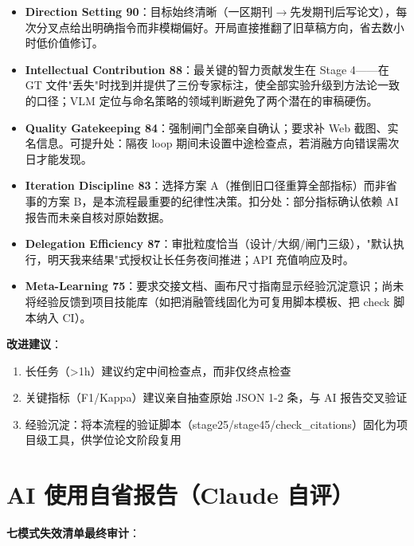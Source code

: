 \documentclass[11pt]{article}
\begin{document}
\begin{itemize}
\item \textbf{Direction Setting 90}{\cjkfont ：目标始终清晰（一区期刊}$\rightarrow${\cjkfont 先发期刊后写论文），每次分叉点给出明确指令而非模糊偏好。开局直接推翻了旧草稿方向，省去数小时低价值修订。}
\item \textbf{Intellectual Contribution 88}{\cjkfont ：最关键的智力贡献发生在} Stage 4------{\cjkfont 在} GT {\cjkfont 文件}"{\cjkfont 丢失}"{\cjkfont 时找到并提供了三份专家标注，使全部实验升级到方法论一致的口径；}VLM {\cjkfont 定位与命名策略的领域判断避免了两个潜在的审稿硬伤。}
\item \textbf{Quality Gatekeeping 84}{\cjkfont ：强制闸门全部亲自确认；要求补} Web {\cjkfont 截图、实名信息。可提升处：隔夜} loop {\cjkfont 期间未设置中途检查点，若消融方向错误需次日才能发现。}
\item \textbf{Iteration Discipline 83}{\cjkfont ：选择方案} A{\cjkfont （推倒旧口径重算全部指标）而非省事的方案} B{\cjkfont ，是本流程最重要的纪律性决策。扣分处：部分指标确认依赖} AI {\cjkfont 报告而未亲自核对原始数据。}
\item \textbf{Delegation Efficiency 87}{\cjkfont ：审批粒度恰当（设计}/{\cjkfont 大纲}/{\cjkfont 闸门三级），}"{\cjkfont 默认执行，明天我来结果}"{\cjkfont 式授权让长任务夜间推进；}API {\cjkfont 充值响应及时。}
\item \textbf{Meta-Learning 75}{\cjkfont ：要求交接文档、画布尺寸指南显示经验沉淀意识；尚未将经验反馈到项目技能库（如把消融管线固化为可复用脚本模板、把} check {\cjkfont 脚本纳入} CI{\cjkfont ）。}
\end{itemize}
\textbf{{\cjkfont 改进建议}}{\cjkfont ：}

\begin{enumerate}
\item {\cjkfont 长任务（}>1h{\cjkfont ）建议约定中间检查点，而非仅终点检查}
\item {\cjkfont 关键指标（}F1/Kappa{\cjkfont ）建议亲自抽查原始} JSON 1-2 {\cjkfont 条，与} AI {\cjkfont 报告交叉验证}
\item {\cjkfont 经验沉淀：将本流程的验证脚本（}stage25/stage45/check\_citations{\cjkfont ）固化为项目级工具，供学位论文阶段复用}
\end{enumerate}
\section{AI {\cjkfont 使用自省报告（}Claude {\cjkfont 自评）}}
\textbf{{\cjkfont 七模式失效清单最终审计}}{\cjkfont ：}
\end{document}
